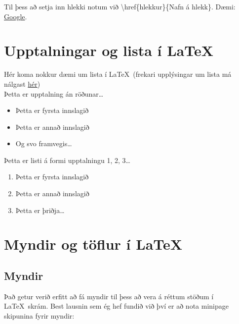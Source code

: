 \documentclass[a4paper]{article}
\begin{document}
Til þess að setja inn hlekki notum við \textbackslash href\{hlekkur\}\{Nafn á hlekk\}. Dæmi: \href{http://google.com}{Google}.


\section{Upptalningar og lista í \LaTeX}
Hér koma nokkur dæmi um lista í \LaTeX\ (frekari upplýsingar um lista má nálgast \href{http://en.wikibooks.org/wiki/LaTeX/List_Structures}{hér}) \\ %

\noindent Þetta er upptalning án röðunar\dots

\begin{itemize}
  \item Þetta er fyrsta innslagið
  \item Þetta er annað innslagið
  \item Og svo framvegis\ldots
\end{itemize}

\noindent Þetta er listi á formi upptalningu 1, 2, 3\dots
\begin{enumerate}
  \item Þetta er fyrsta innslagið
  \item Þetta er annað innslagið
  \item Þetta er þriðja\ldots
\end{enumerate}



\section{Myndir og töflur í \LaTeX}
\subsection{Myndir}
Það getur verið erfitt að fá myndir til þess að vera á réttum stöðum í \LaTeX\ skrám. Best lausnin sem ég hef fundið við því er að nota minipage skipunina fyrir myndir:
\end{document}
